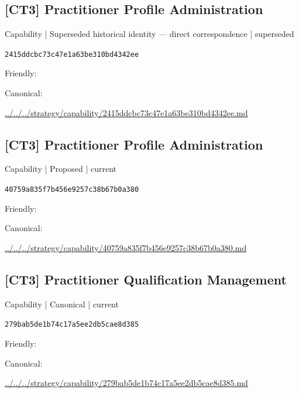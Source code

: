 \documentclass[10pt,a4paper]{article}
\begin{document}
\subsection*{[CT3] Practitioner Profile Administration}
{\small Capability | Superseded historical identity — direct correspondence | superseded}\par
\texttt{2415ddcbc73c47e1a63be310bd4342ee}\par
Friendly: \par
Canonical: \par
{\footnotesize\url{../../../strategy/capability/2415ddcbc73c47e1a63be310bd4342ee.md}}\par
\subsection*{[CT3] Practitioner Profile Administration}
{\small Capability | Proposed | current}\par
\texttt{40759a835f7b456e9257c38b67b0a380}\par
Friendly: \par
Canonical: \par
{\footnotesize\url{../../../strategy/capability/40759a835f7b456e9257c38b67b0a380.md}}\par
\subsection*{[CT3] Practitioner Qualification Management}
{\small Capability | Canonical | current}\par
\texttt{279bab5de1b74c17a5ee2db5cae8d385}\par
Friendly: \par
Canonical: \par
{\footnotesize\url{../../../strategy/capability/279bab5de1b74c17a5ee2db5cae8d385.md}}\par
\end{document}
